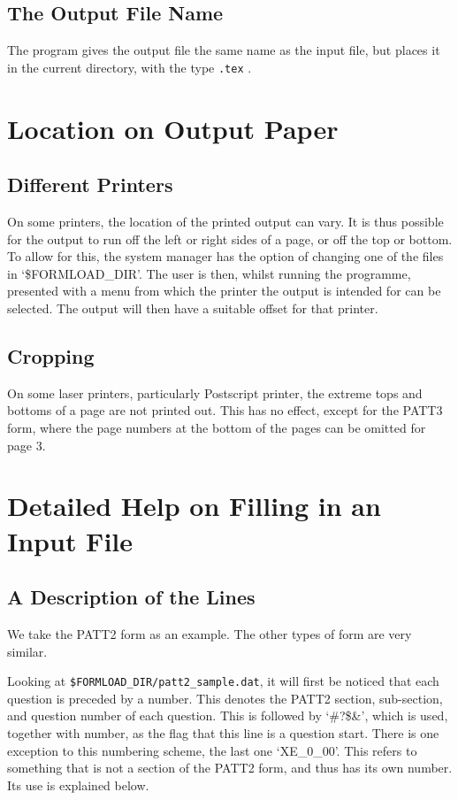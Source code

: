 \subsection{The Output File Name}

The program gives the output file the same name as the input file,
but places it in the current directory, with the type {\tt .tex} .

\section{Location on Output Paper}
\label{se:locate}

\subsection{Different Printers} 

On some printers, the location of the printed output can vary. It is thus
possible for the output to run off the left or right sides of a page, or
off the top or bottom. To allow for this, the system manager has the option
of changing one of the files in `\$FORMLOAD\_DIR'. The user is then, whilst
running the programme, presented with a menu from which the printer the
output is intended for can be selected. The output will then have a
suitable offset for that printer. 


\subsection{Cropping}

On some laser printers, particularly Postscript printer, the extreme tops
and bottoms of a page are not printed out. This has no effect, except for
the PATT3 form, where the page numbers at the bottom of the pages can be
omitted for page 3. 

\section{Detailed Help on Filling in an Input File}
\label{se:details}

\subsection{A Description of the Lines}

We take the PATT2 form as an example. The other types of form are very
similar. 

Looking at {\tt \$FORMLOAD\_DIR/patt2\_sample.dat}, it will first be noticed
that each question is preceded by a number. This denotes the PATT2 section,
sub-section, and question number of each question. This is followed by
`\#?\$\&', which is used, together with number, as the flag that this line
is a question start. There is one exception to this numbering scheme, the
last one `XE\_0\_00'. This refers to something that is not a section of the
PATT2 form, and thus has its own number. Its use is explained below. 

